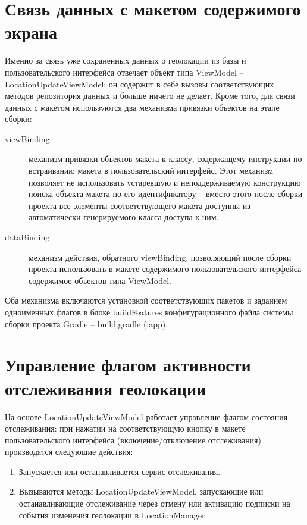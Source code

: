 \section{Связь данных с макетом содержимого экрана}
Именно за связь уже сохраненных данных о геолокации из базы и пользовательского интерфейса отвечает объект типа ViewModel – LocationUpdateViewModel: он содержит в себе вызовы соответствующих методов репозитория данных и больше ничего не делает.
Кроме того, для связи данных с макетом используются два механизма привязки объектов на этапе сборки:
\begin{description}
	\item[viewBinding] механизм привязки объектов макета к классу, содержащему инструкции по встраиванию макета в пользовательский интерфейс. Этот механизм позволяет не использовать устаревшую и неподдерживаемую конструкцию поиска объекта макета по его идентификатору – вместо этого после сборки проекта все элементы соответствующего макета доступны из автоматически генерируемого класса доступа к ним.
	\item[dataBinding] механизм действия, обратного viewBinding, позволяющий после сборки проекта использовать в макете содержимого пользовательского интерфейса содержимое объектов типа ViewModel.
\end{description}
Оба механизма включаются установкой соответствующих пакетов и заданием одноименных флагов в блоке buildFeatures конфигурационного файла системы сборки проекта Gradle – build.gradle (:app).


\section{Управление флагом активности отслеживания геолокации}
На основе LocationUpdateViewModel работает управление флагом состояния отслеживания: при нажатии на соответствующую кнопку в макете пользовательского интерфейса (включение/отключение отслеживания) производятся следующие действия:
\begin{enumerate}
	\item Запускается или останавливается сервис отслеживания.
	\item Вызываются методы LocationUpdateViewModel, запускающие или останавливающие отслеживание через отмену или активацию подписки на события изменения геолокации в LocationManager.
\end{enumerate}
